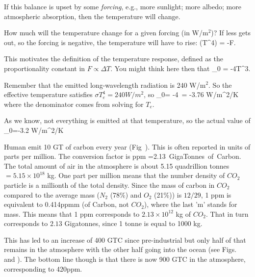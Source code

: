 \documentclass[11pt]{book}
\begin{document}
If this balance is upset by some {\it forcing}, e.g., more sunlight; more albedo; more atmospheric absorption, then the temperature will change. 
\bei
\item How much will the temperature change for a given forcing (in W/m$^2$)? If less gets out, so the forcing is negative, the temperature will have to rise:
\be
\Delta(\sigma T^4) = -F.\ee
\item This motivates the definition of the temperature response, defined as the proportionality constant in $F\propto \Delta T$. You might think here then that
\be
\lambda_0 = -4\sigma T^3.\ee
\item Remember that the emitted long-wavelength radiation is 240 W/m$^2$. So the effective temperature satisfies $\sigma T_e^4=240W/m^2$, so
\be
\lambda_0= -4\, = -3.76 W/m^2/K\ee
where the denominator comes from solving for $T_e$.
\item As we know, not everything is emitted at that temperature, so the actual value of 
\be
\lambda_0=-3.2 W/m^2/K\ee
\eei

\bei
\item
Human emit 10 GT of carbon every year (Fig~). This is often reported in units of parts per million. The conversion factor is
 {\rm ppm} =2.13 \,{\rm GigaTonnes\, of\, Carbon}.
\ee
The total amount of air in the atmosphere is about 5.15 quadrillion tonnes $=5.15\times 10^{18}$ kg. One part per million means that the number density of $CO_2$ particle is a millionth of the total density. Since the mass of carbon in $CO_2$ compared to the average mass ($N_2$ (78\%) and $O_2$ (21\%)) is $12/29$, 1 ppm is equivalent to 0.414ppmm (of Carbon, not $CO_2$), where the last 'm' stands for mass. This means that 1 ppm corresponds to $2.13\times10^{12}$ kg of $CO_2$. That in turn corresponds to $2.13$ Gigatonnes, since 1 tonne is equal to 1000 kg.
\item This has led to an increase of 400 GTC since pre-industrial but only half of that remains in the atmosphere with the other half going into the ocean (see Figs.~ and ).
The bottom line though is that there is now 900 GTC in the atmosphere, corresponding to 420ppm.
\eei
\end{document}
